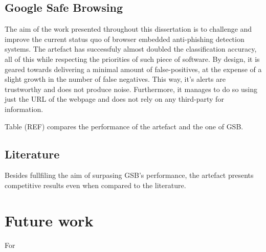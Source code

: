 \subsection{Google Safe Browsing}
The aim of the work presented throughout this dissertation is to challenge and improve the current status quo of browser embedded anti-phishing detection systems. The artefact has successfuly almost doubled the classification accuracy, all of this while respecting the priorities of such piece of software. By design, it is geared towards delivering a minimal amount of false-positives, at the expense of a slight growth in the number of false negatives. This way, it's alerts are trustworthy and does not produce noise. Furthermore, it manages to do so using just the URL of the webpage and does not rely on any third-party for information.

Table (REF) compares the performance of the artefact and the one of GSB.



\subsection{Literature}
Besides fullfiling the aim of surpasing GSB's performance, the artefact presents competitive results even when compared to the literature.


\section{Future work}
For 

% 


\iffalse
The Conclusions chapter marks the end of the project report and it is a summary which brings together many of the points that you have made in other chapters, especially in the previous chapter. It is usually 2 – 3 pages long with three sections:
\begin{enumerate}
	\item Summary: summarise what you have achieved and restate the main results
	\item Evaluation: evaluate what you have achieved and how well you have met the objectives
	\item Future work: explain any limitations and how things might be improved.]
\end{enumerate}

\noindent
[Word count should be included at the end of the last section. Please look at section 5.2 and 5.3 of the Project Handbook for word count policy.]
\newline
Word count (main body of the report): 
\\
Word count (artefact): 

\fi